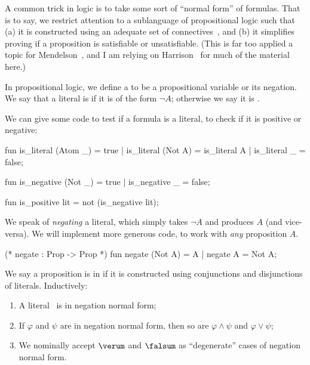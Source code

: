 \begin{node}\label{prop-000P}%
A common trick in logic is to take some sort of ``normal form'' of
formulas. That is to say, we restrict attention to a sublanguage of
propositional logic such that (a) it is constructed using an adequate
set of connectives~, and (b) it simplifies proving if a
proposition is satisfiable or unsatisfiable. (This is far too applied a
topic for Mendelson~\cite{mendelson2015mathematical}, and I am relying on
Harrison~\cite{harrison2009handbook} for much of the material here.)

\begin{definition}\label{prop-000Q}%
In propositional logic, we define a  to be a
propositional variable or its negation. We say that a literal is
 if it is of the form $\neg A$; otherwise we say it is
.

\begin{node}\label{prop:normal-form-000F}%
We can give some code to test if a formula is a literal, to check if it
is positive or negative:

\begin{sml}
fun is_literal (Atom _) = true
 |  is_literal (Not A) = is_literal A
 |  is_literal _ = false;

fun is_negative (Not _) = true
 |  is_negative _ = false;

fun is_positive lit = not (is_negative lit);
\end{sml}
\end{node}

\begin{node}[Negation]\label{prop:normal-form-000G}%
We speak of \emph{negating} a literal, which simply takes $\neg A$ and
produces $A$ (and vice-versa). We will implement more generous code, to
work with \emph{any} proposition $A$.

\begin{sml}
(* negate : Prop -> Prop *)
fun negate (Not A) = A
 |  negate A = Not A;
\end{sml}
\end{node}
\end{definition}

\begin{definition}\label{prop-000O}%
We say a proposition is in  if it is
constructed using conjunctions and disjunctions of
literals. Inductively:
\begin{enumerate}
\item A literal~ is in negation normal form;
\item If $\varphi$ and $\psi$ are in negation normal form, then so are
  $\varphi\land\psi$ and $\varphi\lor\psi$;
\item We nominally accept $\verum$ and $\falsum$ as ``degenerate'' cases
  of negation normal form.
\end{enumerate}
\end{definition}


\end{node}
